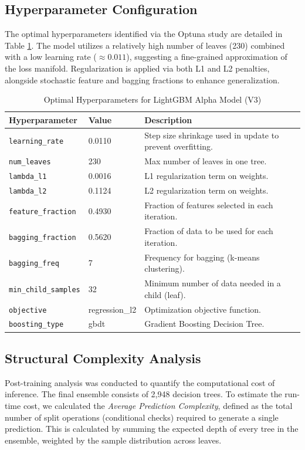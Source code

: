 \documentclass{article}
\begin{document}
\subsection{Hyperparameter Configuration}
The optimal hyperparameters identified via the Optuna study are detailed in Table \ref{tab:hyperparams}. The model utilizes a relatively high number of leaves (230) combined with a low learning rate ($\approx 0.011$), suggesting a fine-grained approximation of the loss manifold. Regularization is applied via both L1 and L2 penalties, alongside stochastic feature and bagging fractions to enhance generalization.

\begin{table}[h]
    \centering
    \caption{Optimal Hyperparameters for LightGBM Alpha Model (V3)}
    \label{tab:hyperparams}
    \begin{tabular}{@{}llp{6cm}@{}}
        \toprule
        \textbf{Hyperparameter} & \textbf{Value} & \textbf{Description} \\ \midrule
        \texttt{learning\_rate} & 0.0110 & Step size shrinkage used in update to prevent overfitting. \\
        \texttt{num\_leaves} & 230 & Max number of leaves in one tree. \\
        \texttt{lambda\_l1} & 0.0016 & L1 regularization term on weights. \\
        \texttt{lambda\_l2} & 0.1124 & L2 regularization term on weights. \\
        \texttt{feature\_fraction} & 0.4930 & Fraction of features selected in each iteration. \\
        \texttt{bagging\_fraction} & 0.5620 & Fraction of data to be used for each iteration. \\
        \texttt{bagging\_freq} & 7 & Frequency for bagging (k-means clustering). \\
        \texttt{min\_child\_samples} & 32 & Minimum number of data needed in a child (leaf). \\
        \texttt{objective} & regression\_l2 & Optimization objective function. \\
        \texttt{boosting\_type} & gbdt & Gradient Boosting Decision Tree. \\
        \bottomrule
    \end{tabular}
\end{table}

\subsection{Structural Complexity Analysis}
Post-training analysis was conducted to quantify the computational cost of inference. The final ensemble consists of 2,948 decision trees. To estimate the run-time cost, we calculated the \textit{Average Prediction Complexity}, defined as the total number of split operations (conditional checks) required to generate a single prediction. This is calculated by summing the expected depth of every tree in the ensemble, weighted by the sample distribution across leaves.
\end{document}
